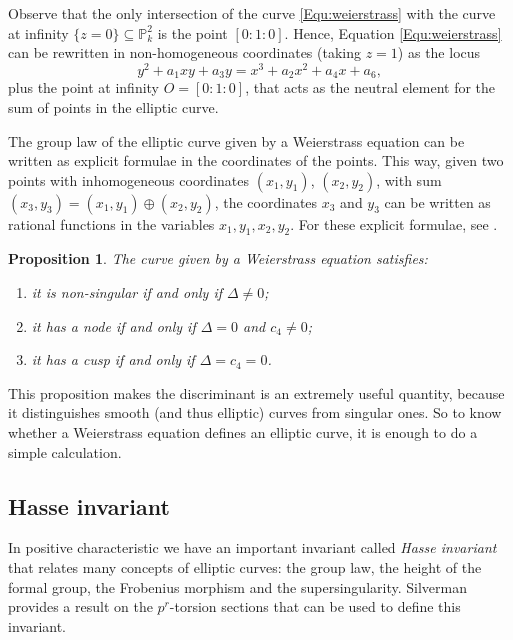 \documentclass{report}
\newtheorem{proposition}[equation]{Proposition}
\theoremstyle{definition}
\begin{document}
Observe that the only intersection of the curve \eqref{Equ:weierstrass} with the curve at infinity $\{z=0\}\subseteq\mathbb{P}_k^2$ is the point $[0:1:0]$. Hence, Equation \eqref{Equ:weierstrass} can be rewritten in non-homogeneous coordinates (taking $z=1$) as the locus
\begin{equation}
\label{eq:weierstrass-no-homo}
y^2+a_1xy+a_3y=x^3+a_2x^2+a_4x+a_6,
\end{equation}
plus the point at infinity $O=[0:1:0]$, that acts as the neutral element for the sum of points in the elliptic curve.

The group law of the elliptic curve given by a Weierstrass equation can be written as explicit formulae in the coordinates of the points. This way, given two points with inhomogeneous coordinates $(x_1,y_1)$, $(x_2,y_2)$, with sum $(x_3,y_3)=(x_1,y_1)\oplus(x_2,y_2)$, the coordinates $x_3$ and $y_3$ can be written as rational functions in the variables $x_1,y_1,x_2,y_2$. For these explicit formulae, see \cite[Group Law Algorithm~III.2.3]{silverman1986arithmetic}.

\begin{proposition}
\label{pro:discriminant}
The curve given by a Weierstrass equation satisfies:
\begin{enumerate}
\item it is non-singular if and only if $\Delta\neq0$;
\item it has a node if and only if $\Delta=0$ and $c_4\neq0$;
\item it has a cusp if and only if $\Delta=c_4=0$.
\end{enumerate}
\end{proposition}

This proposition makes the discriminant is an extremely useful quantity, because it distinguishes smooth (and thus elliptic) curves from singular ones. So to know whether a Weierstrass equation defines an elliptic curve, it is enough to do a simple calculation.

\subsection{Hasse invariant}

In positive characteristic we have an important invariant called \emph{Hasse invariant} that relates many concepts of elliptic curves: the group law, the height of the formal group, the Frobenius morphism and the supersingularity. Silverman \cite[Theorem~V.3.1]{silverman1986arithmetic} provides a result on the $p^r$-torsion sections that can be used to define this invariant.
\end{document}
